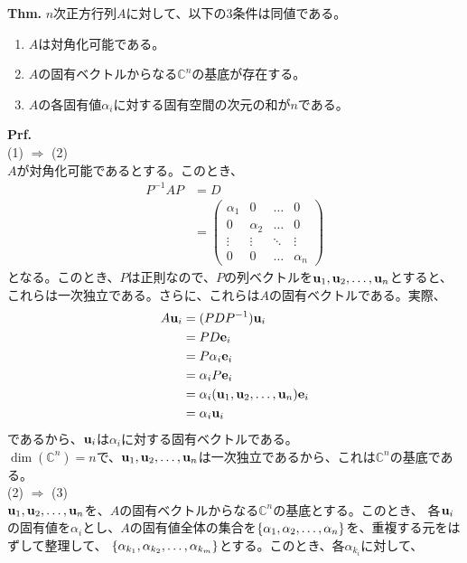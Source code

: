 \documentclass[a4paper,11pt]{jsarticle}
\numberwithin{equation}{section}
\begin{document}
\begin{itembox}[l]{\textbf{Thm.}}
  $n$次正方行列$A$に対して、以下の3条件は同値である。
  \begin{enumerate}
    \item $A$は対角化可能である。
    \item $A$の固有ベクトルからなる$\mathbb{C}^n$の基底が存在する。
    \item $A$の各固有値$\alpha_i$に対する固有空間の次元の和が$n$である。
  \end{enumerate}
\end{itembox}
\textbf{Prf.}\\
(1) $\Rightarrow$ (2)\\
$A$が対角化可能であるとする。このとき、
\begin{align}
  P^{-1}AP &= D\\
  &=
  \begin{pmatrix}
    \alpha_1 & 0 & \dots & 0\\
    0 & \alpha_2 & \dots & 0\\
    \vdots & \vdots & \ddots & \vdots\\
    0 & 0 & \dots & \alpha_n
  \end{pmatrix}
\end{align}
となる。このとき、$P$は正則なので、$P$の列ベクトルを$\vb{u}_1, \vb{u}_2, \dots, \vb{u}_n$とすると、これらは一次独立である。さらに、これらは$A$の固有ベクトルである。実際、
\begin{align}
  A \vb{u}_i &= (PDP^{-1})\vb{u}_i\\
  &= PD\vb{e}_i \\
  &= P\alpha_i\vb{e}_i\\
  &= \alpha_i P\vb{e}_i\\
  &= \alpha_i(\vb{u}_1, \vb{u}_2, \dots, \vb{u}_n)\vb{e}_i\\
  &= \alpha_i\vb{u}_i
\end{align}
であるから、$\vb{u}_i$は$\alpha_i$に対する固有ベクトルである。\\
$\dim (\mathbb{C}^n) = n$で、$\vb{u}_1, \vb{u}_2, \dots, \vb{u}_n$は一次独立であるから、これは$\mathbb{C}^n$の基底である。\\
(2) $\Rightarrow$ (3)\\
$\vb{u}_1, \vb{u}_2, \dots, \vb{u}_n$を、$A$の固有ベクトルからなる$\mathbb{C}^n$の基底とする。このとき、
各$\vb{u}_i$の固有値を$\alpha_i$とし、$A$の固有値全体の集合を$\qty{\alpha_1, \alpha_2, \dots, \alpha_n}$を、重複する元をはずして整理して、
$\qty{\alpha_{k_1}, \alpha_{k_2}, \dots, \alpha_{k_m}}$とする。このとき、各$\alpha_{k_i}$に対して、
\end{document}
